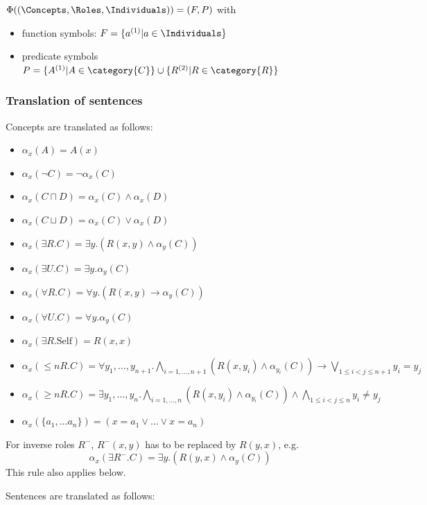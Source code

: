 \documentclass[10pt,fleqn,final]{scrreprt}
\newcommand{\sssclause}[1]{\subsubsection{#1}}
\newenvironment{definitions}[0]{\medskip }{}
\begin{document}
\begin{definitions}
 $\Phi((\Concepts, \Roles, \Individuals)) =  (F, P)$ with
\begin{itemize}
	\item function symbols: $F = \{a^{(1)} \vert a \in \Individuals\}$
	\item predicate symbols $P = \{A^{(1)} \vert A \in \category{C} \} \cup \{ R^{(2)} \vert R \in \category{R}\}$
\end{itemize}


\sssclause{Translation of sentences}

Concepts are translated as follows:
\begin{itemize}
 \item $\alpha_x(A) = A(x)$
 \item $\alpha_x(\lnot C) = \lnot \alpha_x (C)$
 \item $\alpha_x(C \sqcap D) = \alpha_x(C) \land \alpha_x(D)$
 \item $\alpha_x(C \sqcup D) = \alpha_x(C) \lor \alpha_x(D)$ 
 \item $\alpha_x(\exists R.C) = \exists y . (R(x,y) \land \alpha_y(C))$
 \item $\alpha_x(\exists U.C) = \exists y . \alpha_y(C)$
 \item $\alpha_x(\forall R.C) = \forall y . (R(x,y) \rightarrow \alpha_y(C))$
 \item $\alpha_x(\forall U.C) = \forall y . \alpha_y(C)$
 \item $\alpha_x(\exists R.\text{Self}) = R(x,x)$
 \item $\alpha_x(\leq n R. C) = \forall y_1,\ldots,y_{n+1} .  \bigwedge_{i=1,\ldots,n+1}(R(x,y_i) \land \alpha_{y_i}(C)) \rightarrow\bigvee_{1\leq i<j\leq n+1}y_i = y_j$
 \item $\alpha_x(\geq n R. C) = \exists y_1,\ldots,y_n . \bigwedge_{i=1,\ldots,n}(R(x,y_i) \land \alpha_{y_i}(C)) \wedge \bigwedge_{1\leq i<j\leq n}y_i\not= y_j $
 \item $\alpha_x(\{a_1, \ldots a_n \}) = (x=a_1\vee \ldots \vee x=a_n)$
\end{itemize}

For inverse roles $R^-$, $R^-(x,y)$ has to be replaced by $R(y,x)$, e.g.
 $$\alpha_x(\exists R^-.C) = \exists y . (R(y,x) \land \alpha_y(C))$$
This rule also applies below.


Sentences are translated as follows:


\end{definitions}
\end{document}
